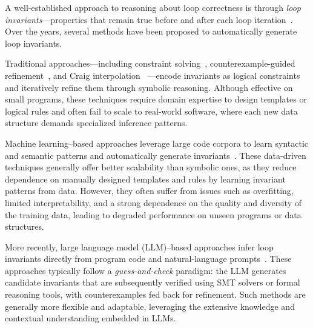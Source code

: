 \documentclass[letterpaper]{article} %
\begin{document}
A well-established approach to reasoning about loop correctness is through \emph{loop invariants}—properties that remain true before and after each loop iteration~\cite{furia2014loop, d2008survey}. Over the years, several methods have been proposed to automatically generate loop invariants.

Traditional approaches—including constraint solving~\cite{Coln2003LinearIG,8603013}, counterexample-guided refinement~\cite{clarke2000counterexample,bogomolov2017counterexample}, and Craig interpolation~\cite{jhala2006practical, mcmillan2010lazy} —encode invariants as logical constraints and iteratively refine them through symbolic reasoning. Although effective on small programs, these techniques require domain expertise to design templates or logical rules and often fail to scale to real-world software, where each new data structure demands specialized inference patterns.

Machine learning–based approaches leverage large code corpora to learn syntactic and semantic patterns and automatically generate invariants~\cite{garg2014ice,garg2016learning,nguyen2017counterexample,si2020code2inv}. These data-driven techniques generally offer better scalability than symbolic ones, as they reduce dependence on manually designed templates and rules by learning invariant patterns from data. 
However, they often suffer from issues such as overfitting, limited interpretability, and a strong dependence on the quality and diversity of the training data, leading to degraded performance on unseen programs or data structures.

More recently, large language model (LLM)–based approaches infer loop invariants directly from program code and natural-language prompts~\cite{wu2024llm,cao2025clause2inv,LIU2026103387}. These approaches typically follow a \emph{guess-and-check} paradigm: the LLM generates candidate invariants that are subsequently verified using SMT solvers or formal reasoning tools, with counterexamples fed back for refinement. 
Such methods are generally more flexible and adaptable, leveraging the extensive knowledge and contextual understanding embedded in LLMs.
\end{document}
